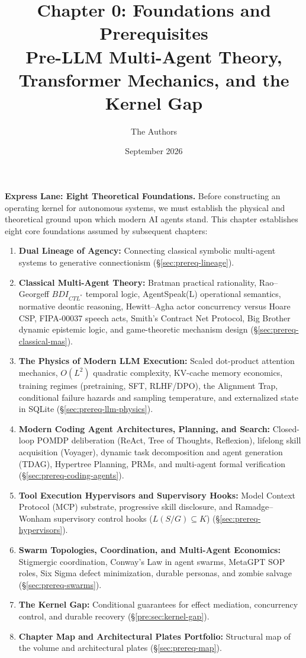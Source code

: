 \documentclass[11pt,a4paper]{article}
\title{\textbf{Chapter 0: Foundations and Prerequisites}\\
\large Pre-LLM Multi-Agent Theory, Transformer Mechanics, and the Kernel Gap}
\author{The Authors}
\date{September 2026}
\begin{document}
\maketitle


\noindent\textbf{Express Lane: Eight Theoretical Foundations.} Before constructing an operating kernel for autonomous systems, we must establish the physical and theoretical ground upon which modern AI agents stand. This chapter establishes eight core foundations assumed by subsequent chapters:
\begin{enumerate}[leftmargin=1.8em,itemsep=3pt]
  \item \textbf{Dual Lineage of Agency:} Connecting classical symbolic multi-agent systems to generative connectionism (\S\ref{sec:prereq-lineage}).
  \item \textbf{Classical Multi-Agent Theory:} Bratman practical rationality, Rao--Georgeff $BDI_{CTL^*}$ temporal logic, AgentSpeak(L) operational semantics, normative deontic reasoning, Hewitt--Agha actor concurrency versus Hoare CSP, FIPA-00037 speech acts, Smith's Contract Net Protocol, Big Brother dynamic epistemic logic, and game-theoretic mechanism design (\S\ref{sec:prereq-classical-mas}).
  \item \textbf{The Physics of Modern LLM Execution:} Scaled dot-product attention mechanics, $O(L^2)$ quadratic complexity, KV-cache memory economics, training regimes (pretraining, SFT, RLHF/DPO), the Alignment Trap, conditional failure hazards and sampling temperature, and externalized state in SQLite (\S\ref{sec:prereq-llm-physics}).
  \item \textbf{Modern Coding Agent Architectures, Planning, and Search:} Closed-loop POMDP deliberation (ReAct, Tree of Thoughts, Reflexion), lifelong skill acquisition (Voyager), dynamic task decomposition and agent generation (TDAG), Hypertree Planning, PRMs, and multi-agent formal verification (\S\ref{sec:prereq-coding-agents}).
  \item \textbf{Tool Execution Hypervisors and Supervisory Hooks:} Model Context Protocol (MCP) substrate, progressive skill disclosure, and Ramadge--Wonham supervisory control hooks ($L(S/G) \subseteq K$) (\S\ref{sec:prereq-hypervisors}).
  \item \textbf{Swarm Topologies, Coordination, and Multi-Agent Economics:} Stigmergic coordination, Conway's Law in agent swarms, MetaGPT SOP roles, Six Sigma defect minimization, durable personas, and zombie salvage (\S\ref{sec:prereq-swarms}).
  \item \textbf{The Kernel Gap:} Conditional guarantees for effect mediation, concurrency control, and durable recovery (\S\ref{pre:sec:kernel-gap}).
  \item \textbf{Chapter Map and Architectural Plates Portfolio:} Structural map of the volume and architectural plates (\S\ref{sec:prereq-map}).
\end{enumerate}
\end{document}
